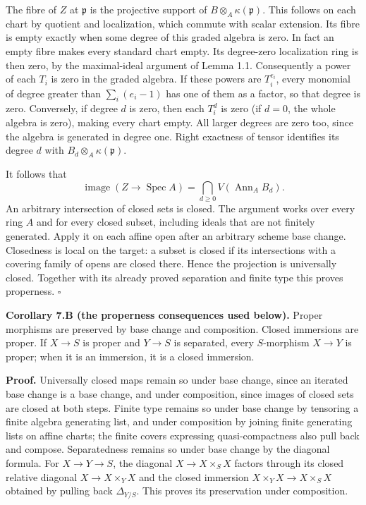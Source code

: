 \documentclass[11pt,a4paper,openany]{report}
\begin{document}
The fibre of \(Z\) at \(\mathfrak p\) is the projective support of \(B\otimes_A\kappa(\mathfrak p)\). This follows on each chart by quotient and localization, which commute with scalar extension. Its fibre is empty exactly when some degree of this graded algebra is zero. In fact an empty fibre makes every standard chart empty. Its degree-zero localization ring is then zero, by the maximal-ideal argument of Lemma 1.1. Consequently a power of each \(T_i\) is zero in the graded algebra. If these powers are \(T_i^{e_i}\), every monomial of degree greater than \(\sum_i(e_i-1)\) has one of them as a factor, so that degree is zero. Conversely, if degree \(d\) is zero, then each \(T_i^d\) is zero (if \(d=0\), the whole algebra is zero), making every chart empty. All larger degrees are zero too, since the algebra is generated in degree one. Right exactness of tensor identifies its degree \(d\) with \(B_d\otimes_A\kappa(\mathfrak p)\).

It follows that \[
 \operatorname{image}(Z\to\operatorname{Spec}A)
    =\bigcap_{d\geq0}V(\operatorname{Ann}_A B_d).
\] An arbitrary intersection of closed sets is closed. The argument works over every ring \(A\) and for every closed subset, including ideals that are not finitely generated. Apply it on each affine open after an arbitrary scheme base change. Closedness is local on the target: a subset is closed if its intersections with a covering family of opens are closed there. Hence the projection is universally closed. Together with its already proved separation and finite type this proves properness. \(\square\)

\textbf{Corollary 7.B (the properness consequences used below).} Proper morphisms are preserved by base change and composition. Closed immersions are proper. If \(X\to S\) is proper and \(Y\to S\) is separated, every \(S\)-morphism \(X\to Y\) is proper; when it is an immersion, it is a closed immersion.

\textbf{Proof.} Universally closed maps remain so under base change, since an iterated base change is a base change, and under composition, since images of closed sets are closed at both steps. Finite type remains so under base change by tensoring a finite algebra generating list, and under composition by joining finite generating lists on affine charts; the finite covers expressing quasi-compactness also pull back and compose. Separatedness remains so under base change by the diagonal formula. For \(X\to Y\to S\), the diagonal \(X\to X\times_SX\) factors through its closed relative diagonal \(X\to X\times_YX\) and the closed immersion \(X\times_YX\to X\times_SX\) obtained by pulling back \(\Delta_{Y/S}\). This proves its preservation under composition.
\end{document}
